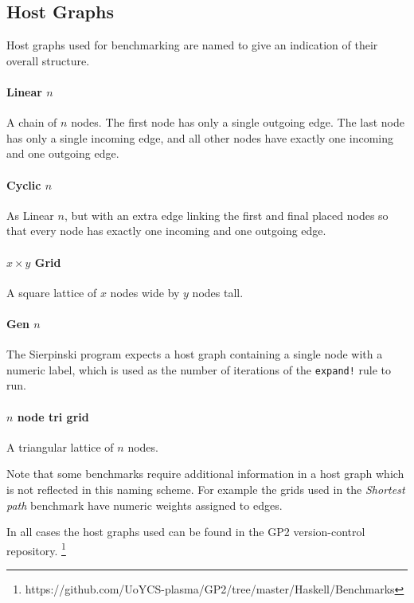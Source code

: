 \subsection{Host Graphs}
\label{subsec:hosts}

Host graphs used for benchmarking are named to give an indication of their overall structure.


\paragraph*{Linear $n$}

A chain of $n$ nodes. The first node has only a single outgoing edge. The last node has only a single incoming edge, and all other nodes have exactly one incoming and one outgoing edge.

\paragraph*{Cyclic $n$}

As Linear $n$, but with an extra edge linking the first and final placed nodes so that every node has exactly one incoming and one outgoing edge.

\paragraph*{$x \times y$ Grid}

A square lattice of $x$ nodes wide by $y$ nodes tall.

\paragraph*{Gen $n$}

The Sierpinski program expects a host graph containing a single node with a numeric label, which is used as the number of iterations of the \texttt{expand!} rule to run.

\paragraph*{$n$ node tri grid}

A triangular lattice of $n$ nodes.


Note that some benchmarks require additional information in a host graph which is not reflected in this naming scheme. For example the grids used in the \textit{Shortest path} benchmark have numeric weights assigned to edges.

In all cases the host graphs used can be found in the GP2 version-control repository.
\footnote{https://github.com/UoYCS-plasma/GP2/tree/master/Haskell/Benchmarks} %



